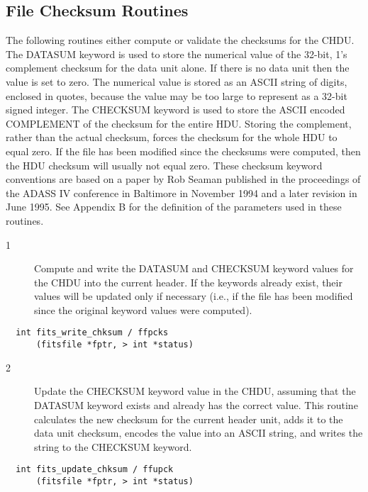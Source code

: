 \documentclass[11pt]{book}
\begin{document}
\subsection{File Checksum Routines}

The following routines either compute or validate the checksums for the
CHDU.  The DATASUM keyword is used to store the numerical value of the
32-bit, 1's complement checksum for the data unit alone.  If there is
no data unit then the value is set to zero. The numerical value is
stored as an ASCII string of digits, enclosed in quotes, because the
value may be too large to represent as a 32-bit signed integer.  The
CHECKSUM keyword is used to store the ASCII encoded COMPLEMENT of the
checksum for the entire HDU.  Storing the complement, rather than the
actual checksum, forces the checksum for the whole HDU to equal zero.
If the file has been modified since the checksums were computed, then
the HDU checksum will usually not equal zero.  These checksum keyword
conventions are based on a paper by Rob Seaman published in the
proceedings of the ADASS IV conference in Baltimore in November 1994
and a later revision in June 1995.  See Appendix B for the definition
of the parameters used in these routines.


\begin{description}
\item[1 ] Compute and write the DATASUM and CHECKSUM keyword values for the CHDU
    into the current header.  If the keywords already exist, their values
    will be updated only if necessary (i.e., if the file
    has been modified since the original keyword
   values were computed). \label{ffpcks}
\end{description}

\begin{verbatim}
  int fits_write_chksum / ffpcks
      (fitsfile *fptr, > int *status)
\end{verbatim}

\begin{description}
\item[2 ] Update the CHECKSUM keyword value in the CHDU, assuming that the
    DATASUM keyword exists and already has the correct value.  This routine
    calculates the new checksum for the current header unit, adds it to the
    data unit checksum, encodes the value into an ASCII string, and writes
   the string to the CHECKSUM keyword. \label{ffupck}
\end{description}

\begin{verbatim}
  int fits_update_chksum / ffupck
      (fitsfile *fptr, > int *status)
\end{verbatim}
\end{document}
